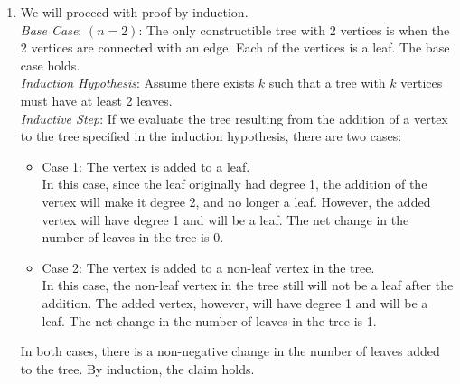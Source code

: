 \documentclass[a4paper]{article}
\newcommand{\<}{\langle}
\renewcommand{\>}{\rangle}
\renewcommand{\^}{\wedge}
\begin{document}
\begin{enumerate}
\begin{enumerate}
            \item We will proceed with proof by induction.\\
            \textit{Base Case}: $(n=2)$: The only constructible tree with 2 vertices is when the 2 vertices are connected with an edge. Each of the vertices is a leaf. The base case holds.\\
            \textit{Induction Hypothesis}: Assume there exists $k$ such that a tree with $k$ vertices must have at least 2 leaves.\\
            \textit{Inductive Step}: If we evaluate the tree resulting from the addition of a vertex to the tree specified in the induction hypothesis, there are two cases:
            \begin{itemize}
                \item Case 1: The vertex is added to a leaf.\\
                In this case, since the leaf originally had degree 1, the addition of the vertex will make it degree 2, and no longer a leaf. However, the added vertex will have degree 1 and will be a leaf. The net change in the number of leaves in the tree is 0.
                \item Case 2: The vertex is added to a non-leaf vertex in the tree.\\
                In this case, the non-leaf vertex in the tree still will not be a leaf after the addition. The added vertex, however, will have degree 1 and will be a leaf. The net change in the number of leaves in the tree is 1.
            \end{itemize}
            In both cases, there is a non-negative change in the number of leaves added to the tree. By induction, the claim holds.
        \end{enumerate}
        
\end{enumerate}
\end{document}
